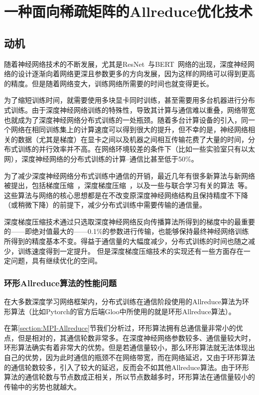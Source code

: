 \chapter{一种面向稀疏矩阵的Allreduce优化技术}
\label{chap3}

\section{动机}

随着神经网络技术的不断发展，尤其是ResNet~\cite{he2016deep}与BERT~\cite{devlin2018bert}网络的出现，深度神经网络的设计逐渐向着网络更深且参数更多的方向发展，因为这样的网络可以得到更高的精度。但是随着网络变大，训练网络所需要的时间也就变得更长。

为了缩短训练时间，就需要使用多块显卡同时训练，甚至需要用多台机器进行分布式训练。由于深度神经网络训练的特殊性，导致其计算与通信难以重叠，网络带宽也就成为了深度神经网络分布式训练的一处瓶颈。随着多台计算设备的引入，同一个网络在相同训练集上的计算速度可以得到很大的提升，但不幸的是，神经网络相关的数据（尤其是梯度）在显卡之间以及机器之间相互传输花费了大量的时间，分布式训练的并行效率并不高。在网络环境较差的条件下（比如一些实验室只有以太网），深度神经网络的分布式训练的计算--通信比甚至低于50\%。

为了减少深度神经网络分布式训练中通信的开销，最近几年有很多新算法与新网络被提出，包括梯度压缩~\cite{han2015deep}，深度梯度压缩~\cite{lin2017deep}，以及一些与联合学习有关的算法~\cite{konevcny2016federated, mcmahan2016communication}等。这些算法与网络的核心思想都是在不改变原深度神经网络结构且保持精度不下降（或稍微下降）的前提下，减少分布式训练中需要传输的通信量。

深度梯度压缩技术通过只选取深度神经网络反向传播算法所得到的梯度中的最重要的——即绝对值最大的——0.1\%的参数进行传输，也能够保持最终神经网络训练所得到的精度基本不变。得益于通信量的大幅度减少，分布式训练的时间也随之减少，训练速度得到一定提升。
但是深度梯度压缩技术的实现还有一些方面存在一定问题，具有继续优化的空间。

\subsection{环形Allreduce算法的性能问题}
  在大多数深度学习网络框架内，分布式训练在通信阶段使用的Allreduce算法为环形算法（比如Pytorch的官方后端Gloo中所使用的就是环形Allreduce算法）。
  
  在第\ref{section:MPI-Allreduce}节我们分析过，环形算法拥有总通信量非常小的优点，但是相对的，其通信轮数非常多。在深度神经网络参数较多、通信量较大时，环形算法确实有着非常大的优势。但是若通信量较小，那么环形算法就无法体现出自己的优势，因为此时通信的瓶颈不在网络带宽，而在网络延迟，又由于环形算法的通信轮数较多，引入了较大的延迟，反而会不如其他Allreduce算法。由于环形算法的通信轮数与节点数成正相关，所以节点数越多时，环形算法在通信量较小的传输中的劣势也就越大。
  
